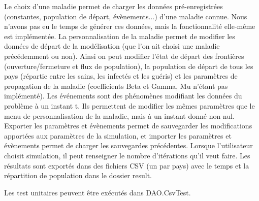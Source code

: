 \documentclass[12pt,a4paper]{report}
\begin{document}
\begin{flushleft}
Le choix d'une maladie permet de charger les données pré-enregistrées (constantes, population de départ, évènements...) d'une maladie connue. Nous n'avons pas eu le temps de générer ces données, mais la fonctionnalité elle-même est implémentée. \newline
La personnalisation de la maladie permet de modifier les données de départ de la modélisation (que l'on ait choisi une maladie précédemment ou non). Ainsi on peut modifier l'état de départ des frontières (ouverture/fermeture et flux de population), la 
population de départ de tous les pays (répartie entre les sains, les infectés et les guéris) et les paramètres de propagation de la maladie (coefficients Beta et Gamma, Mu n'étant pas implémenté). \newline
Les événements sont des phénomènes modifiant les données du problème à un instant t. Ils permettent de modifier les mêmes paramètres que le menu de personnalisation de la maladie, mais à un instant donné non nul. \newline
Exporter les paramètres et évènements permet de sauvegarder les modifications apportées aux paramètres de la simulation, et importer les paramètres et évènements permet de charger les sauvegardes précédentes. \newline
	Lorsque l'utilisateur choisit simulation, il peut renseigner le nombre d'itérations qu'il veut faire. Les résultats sont exportés dans des fichiers CSV (un par pays) avec le temps et la répartition de population dans le dossier result.
\end{flushleft}

\begin{flushleft}
	Les test unitaires peuvent être exécutés dans DAO.CsvTest.
\end{flushleft}
\end{document}
